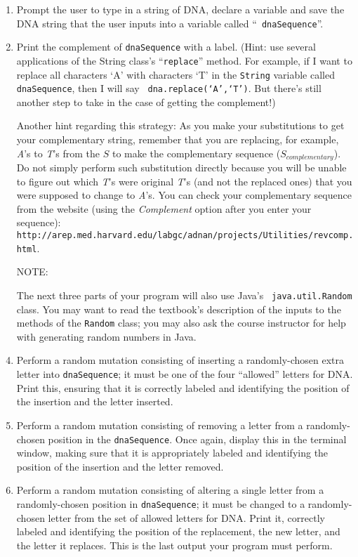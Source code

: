 \documentclass[11pt]{article}
\newcommand{\url}[1]{\lstinline{#1}}
\begin{document}
\begin{enumerate}

\item Prompt the user to type in a string of DNA, declare a variable and save
  the DNA string that the user inputs into a variable called ``{\tt
  dnaSequence}''.

\item Print the complement of {\tt dnaSequence} with a label. (Hint: use
  several applications of the String class's ``{\tt replace}'' method. For
  example, if I want to replace all characters `A' with characters `T' in the
  {\tt String} variable called {\tt dnaSequence}, then I will say {\tt
  dna.replace(`A',`T')}. But there's still another step to take in the case of
  getting the complement!)

Another hint regarding this strategy: As you make your substitutions to get your
complementary string, remember that you are replacing, for example, \emph{A}'s
to \emph{T}'s from the $S$ to make the complementary sequence
($S_{complementary}$). Do not simply perform such substitution directly because
you will be unable to figure out which \emph{T}'s were original \emph{T}'s (and
not the replaced ones) that you were supposed to change to \emph{A}'s. You can
check your complementary sequence from the website  (using the \emph{Complement}
option after you enter your sequence):
\url{http://arep.med.harvard.edu/labgc/adnan/projects/Utilities/revcomp.html}.

\item[NOTE:]

  The next three parts of your program will also use Java's {\tt
  java.util.Random} class. You may want to read the textbook's description of
  the inputs to the methods of the {\tt Random} class; you may also ask the
  course instructor for help with generating random numbers in Java.

\item \begin{sloppypar} Perform a random mutation consisting of inserting a
    randomly-chosen extra letter into {\tt dnaSequence}; it must be one of the
    four ``allowed'' letters for DNA. Print this, ensuring that it is correctly
    labeled and identifying the position of the insertion and the letter
  inserted. \end{sloppypar}

\item Perform a random mutation consisting of removing a letter from a
  randomly-chosen position in the {\tt dnaSequence}. Once again, display this in
  the terminal window, making sure that it is appropriately labeled and
  identifying the position of the insertion and the letter removed.

\item Perform a random mutation consisting of altering a single letter from a
  randomly-chosen position in {\tt dnaSequence}; it must be changed to a
  randomly-chosen letter from the set of allowed letters for DNA. Print it,
  correctly labeled and identifying the position of the replacement, the new
  letter, and the letter it replaces. This is the last output your program must
  perform.

\end{enumerate}
\end{document}
